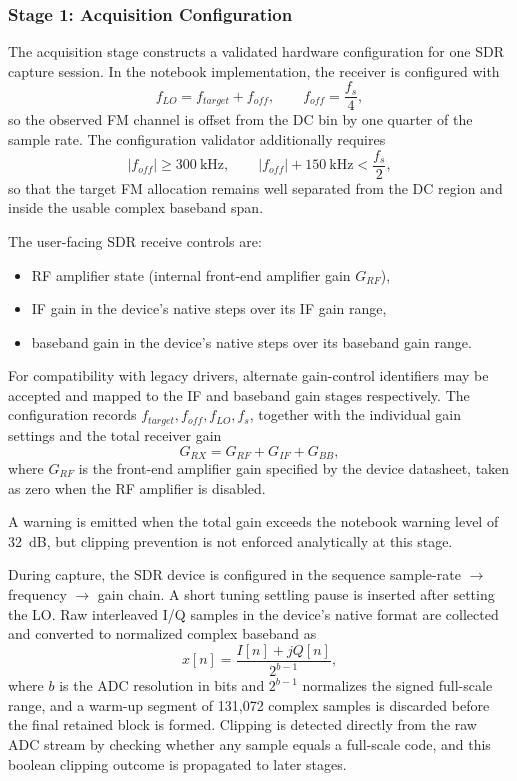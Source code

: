\documentclass[11pt]{article}
\begin{document}
\subsubsection*{Stage 1: Acquisition Configuration}

The acquisition stage constructs a validated hardware configuration for one SDR capture session. In the notebook implementation, the receiver is configured with
\begin{equation}
f_{LO} = f_{target} + f_{off}, \qquad f_{off} = \frac{f_s}{4},
\end{equation}
so the observed FM channel is offset from the DC bin by one quarter of the sample rate. The configuration validator additionally requires
\begin{equation}
|f_{off}| \geq 300~\text{kHz}, \qquad |f_{off}| + 150~\text{kHz} < \frac{f_s}{2},
\end{equation}
so that the target FM allocation remains well separated from the DC region and inside the usable complex baseband span.

The user-facing SDR receive controls are:
\begin{itemize}
    \item RF amplifier state (internal front-end amplifier gain $G_{RF}$),
    \item IF gain in the device's native steps over its IF gain range,
    \item baseband gain in the device's native steps over its baseband gain range.
\end{itemize}

For compatibility with legacy drivers, alternate gain-control identifiers may be accepted and mapped to the IF and baseband gain stages respectively. The configuration records $f_{target}, f_{off}, f_{LO}, f_s$, together with the individual gain settings and the total receiver gain
\begin{equation}
G_{RX} = G_{RF} + G_{IF} + G_{BB},
\end{equation}
where $G_{RF}$ is the front-end amplifier gain specified by the device datasheet, taken as zero when the RF amplifier is disabled.

A warning is emitted when the total gain exceeds the notebook warning level of 32~dB, but clipping prevention is not enforced analytically at this stage.

During capture, the SDR device is configured in the sequence sample-rate $\rightarrow$ frequency $\rightarrow$ gain chain. A short tuning settling pause is inserted after setting the LO. Raw interleaved I/Q samples in the device's native format are collected and converted to normalized complex baseband as
\begin{equation}
x[n] = \frac{I[n] + jQ[n]}{2^{b-1}},
\label{eq:iq-normalization}
\end{equation}
where $b$ is the ADC resolution in bits and $2^{b-1}$ normalizes the signed full-scale range, and a warm-up segment of 131{,}072 complex samples is discarded before the final retained block is formed. Clipping is detected directly from the raw ADC stream by checking whether any sample equals a full-scale code, and this boolean clipping outcome is propagated to later stages.
\end{document}
